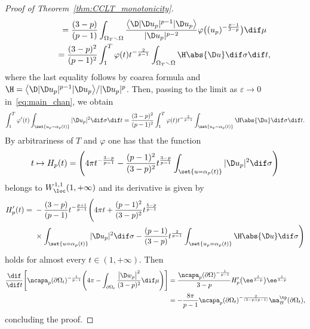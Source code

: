\begin{proof}[Proof of Theorem~\ref{thm:CCLT_monotonicity}]
\begin{gather*}
 \qquad {}=
 \frac{(3-p)}{(p-1)} \int_{\Omega_T \smallsetminus \Omega} \frac{ \big\langle \D | \D u_p |^{p-1} | \D u_p\big\rangle}{| \D u_p |^{p-2}} \varphi \big((u_p)^{-\frac{p-1}{3-p}}\big)\dif \mu \\
 \qquad {}=
 \frac{(3-p)^2}{(p-1)^2}\int_1^{T}\varphi(t) t^{-\frac{2}{p-1}} \int_{\Omega_T \smallsetminus \Omega} \H \abs{ \D u} \dif \sigma \dif t,
\end{gather*}
where the last equality follows by coarea formula and $\H= \big\langle\D | \D u_p |^{p-1} | \D u_p\big\rangle / | \D u_p |^p$. Then, passing to the limit as $\varepsilon \to 0$ in~\eqref{eq:main_chan}, we obtain
\[
 \int_1^{T} \varphi'(t) \int_{\set{u_p=\alpha_p(t)}} | \D u_p |^2 \dif \sigma \dif t =
 \frac{(3-p)^2}{(p-1)^2}\int_1^{T}\varphi(t) t^{-\frac{2}{p-1} } \int_{\set{u_p= \alpha_p(t)}} \H \abs{ \D u} \dif \sigma \dif t.
\]
By arbitrariness of $T$ and $\varphi$ one has that the function
\[
 t \mapsto H_p(t)=\Bigg(4 \pi t^{-\frac{3-p}{p-1}}-\frac{(p-1)^2}{(3-p)^2}t^{\frac{3-p}{p-1}} \int_{\set{u=\alpha_p(t)}} |\D u_p |^2 \dif \sigma\Bigg)
\]
belongs to $W^{1,1}_{\loc}(1,+\infty)$ and its derivative is given by
\begin{align*}
H'_p(t)={}& -\frac{(3-p)}{(p-1)}t^{-\frac{p+1}{p-1}}\Bigg(4 \pi t+ \frac{(p-1)^2}{(3-p)^2} t^{\frac{5-p}{p-1}} \\
&{}\times \int_{\set{u=\alpha_p(t)}} |\D u_p |^2 \dif \sigma - \frac{(p-1)}{(3-p)} t^{\frac{2}{p-1}}\int_{\set{u_p= \alpha_p(t)}} \H \abs{ \D u} \dif \sigma\Bigg)
\end{align*}
holds for almost every $t \in (1,+\infty)$. Then
\begin{align*}
 \frac{\dif}{\dif t}\Bigg[\ncapa_p(\partial \Omega_t)^{-\frac{1}{p-1}}\Bigg( 4 \pi - \int_{\partial \Omega_t} \frac{\big|\D w_p\big|^2}{(3-p)^2}\dif \mu\Bigg)\Bigg] &{}= \frac{\ncapa_p(\partial \Omega)^{-\frac{1}{p-1}}}{3-p} H'_p\big(\ee^{\frac{t}{3-p}}\big) \ee^{\frac{t}{3-p}}\\
 &{}=- \frac{8\pi}{p-1}\ncapa_p(\partial \Omega_t)^{-\frac{2}{(3-p)(p-1)}}\ma_{H}^{\tp}(\partial \Omega_t),
\end{align*}
concluding the proof.\end{proof}
